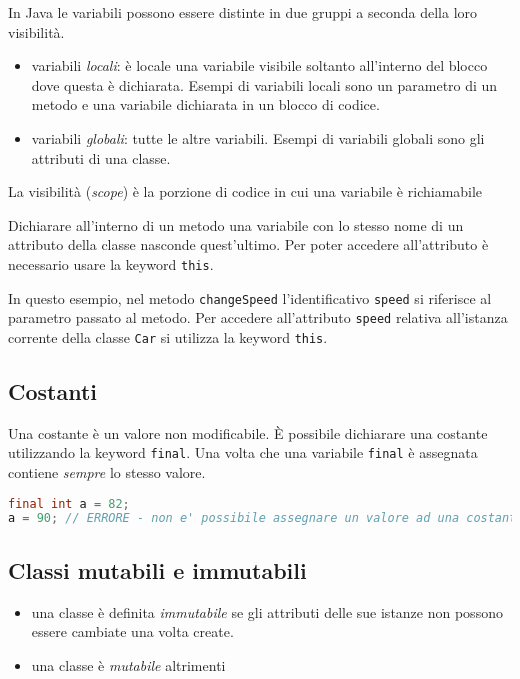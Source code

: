 \documentclass{article}
\begin{document}
In Java le variabili possono essere distinte in due gruppi a seconda della loro visibilità.

\begin{itemize}
\item variabili \emph{locali}: è locale una variabile visibile soltanto all'interno del blocco dove questa è dichiarata.
Esempi di variabili locali sono un parametro di un metodo e una variabile dichiarata in un blocco di codice.
\item variabili \emph{globali}: tutte le altre variabili. Esempi di variabili globali sono gli attributi di una classe.
\end{itemize}

\begin{mydef} La visibilità (\emph{scope}) è la porzione di codice in cui una variabile è richiamabile
\end{mydef}
Dichiarare all'interno di un metodo una variabile con lo stesso nome di un attributo della classe nasconde quest'ultimo.
Per poter accedere all'attributo è necessario usare la keyword \texttt{this}.



In questo esempio, nel metodo \texttt{changeSpeed} l'identificativo \texttt{speed} si riferisce al parametro passato al metodo.
Per accedere all'attributo \texttt{speed} relativa all'istanza corrente della classe \texttt{Car} si utilizza la keyword \texttt{this}. 

\subsection{Costanti}
Una costante è un valore non modificabile.
È possibile dichiarare una costante utilizzando la keyword
\texttt{final}.  Una volta che una variabile \texttt{final} \`e assegnata contiene \emph{sempre} lo stesso valore.

\begin{lstlisting}[language=Java,escapechar=|]
final int a = 82;
a = 90; // ERRORE - non e' possibile assegnare un valore ad una costante
\end{lstlisting}

\subsection{Classi mutabili e immutabili}
\begin{itemize}
\item una classe è definita \emph{immutabile} se gli attributi delle sue istanze non possono essere cambiate una volta create.
\item una classe è \emph{mutabile} altrimenti
\end{itemize}
\end{document}
